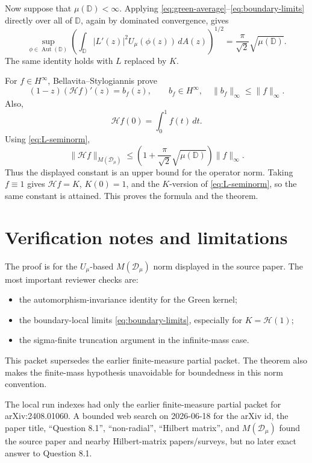 \documentclass[11pt]{article}
\newcommand{\D}{\mathbb D}
\newcommand{\Aut}{\operatorname{Aut}(\D)}
\newcommand{\HH}{\mathcal H}
\newcommand{\MD}{M(\mathcal D_\mu)}
\newcommand{\dA}{\,dA}
\begin{document}
Now suppose that \(\mu(\D)<\infty\).  Applying
\eqref{eq:green-average}--\eqref{eq:boundary-limits} directly over all of
\(\D\), again by dominated convergence, gives
\begin{equation}\label{eq:L-seminorm}
\sup_{\phi\in\Aut}
\left(\int_{\D}|L'(z)|^2U_\mu(\phi(z))\dA(z)\right)^{1/2}
=\frac{\pi}{\sqrt2}\sqrt{\mu(\D)}.
\end{equation}
The same identity holds with \(L\) replaced by \(K\).

For \(f\in H^\infty\), Bellavita--Stylogiannis prove
\[
 (1-z)(\HH f)'(z)=b_f(z),
 \qquad b_f\in H^\infty,\quad \|b_f\|_\infty\leq\|f\|_\infty .
\]
Also,
\[
 \HH f(0)=\int_0^1 f(t)\,dt.
\]
Using \eqref{eq:L-seminorm},
\[
 \|\HH f\|_{\MD}
 \leq
 \left(1+\frac{\pi}{\sqrt2}\sqrt{\mu(\D)}\right)\|f\|_\infty .
\]
Thus the displayed constant is an upper bound for the operator norm.  Taking
\(f\equiv1\) gives \(\HH f=K\), \(K(0)=1\), and the \(K\)-version of
\eqref{eq:L-seminorm}, so the same constant is attained.  This proves the
formula and the theorem.

\section*{Verification notes and limitations}

The proof is for the \(U_\mu\)-based \(M(\mathcal D_\mu)\) norm displayed in
the source paper.  The most important reviewer checks are:

\begin{itemize}
\item the automorphism-invariance identity for the Green kernel;
\item the boundary-local limits \eqref{eq:boundary-limits}, especially for
  \(K=\HH(1)\);
\item the sigma-finite truncation argument in the infinite-mass case.
\end{itemize}

This packet supersedes the earlier finite-measure partial packet.  The theorem
also makes the finite-mass hypothesis unavoidable for boundedness in this
norm convention.

The local run indexes had only the earlier finite-measure partial packet for
arXiv:2408.01060.  A bounded web search on 2026-06-18 for the arXiv id, the
paper title, ``Question 8.1'', ``non-radial'', ``Hilbert matrix'', and
\(M(\mathcal D_\mu)\) found the source paper and nearby Hilbert-matrix
papers/surveys, but no later exact answer to Question 8.1.
\end{document}
